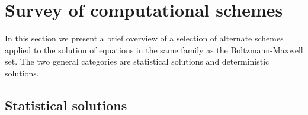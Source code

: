 \documentclass[11pt,titlepage]{report}
\begin{document}




\section{Survey of computational schemes}

\indent \indent In this section we present a brief overview of a selection of alternate schemes applied to the solution of equations in the same family as the Boltzmann-Maxwell set. The two general categories are statistical solutions and deterministic solutions. 

\subsection{Statistical solutions}
\end{document}
